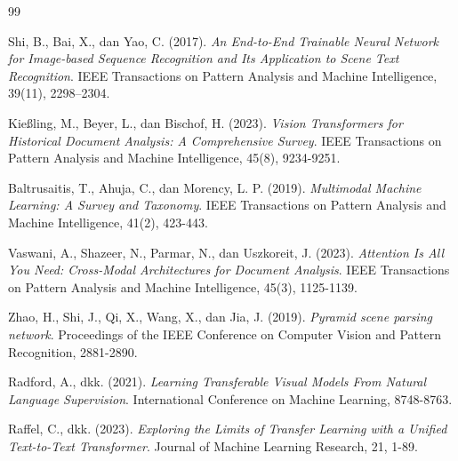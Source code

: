 \documentclass[12pt,a4paper]{book}
\begin{document}
\begin{thebibliography}{99}

Shi, B., Bai, X., dan Yao, C. (2017).
\textit{An End-to-End Trainable Neural Network for Image-based Sequence Recognition and Its Application to Scene Text Recognition}.
IEEE Transactions on Pattern Analysis and Machine Intelligence, 39(11), 2298--2304.

Kießling, M., Beyer, L., dan Bischof, H. (2023).
\textit{Vision Transformers for Historical Document Analysis: A Comprehensive Survey}.
IEEE Transactions on Pattern Analysis and Machine Intelligence, 45(8), 9234-9251.


Baltrusaitis, T., Ahuja, C., dan Morency, L. P. (2019).
\textit{Multimodal Machine Learning: A Survey and Taxonomy}.
IEEE Transactions on Pattern Analysis and Machine Intelligence, 41(2), 423-443.

Vaswani, A., Shazeer, N., Parmar, N., dan Uszkoreit, J. (2023).
\textit{Attention Is All You Need: Cross-Modal Architectures for Document Analysis}.
IEEE Transactions on Pattern Analysis and Machine Intelligence, 45(3), 1125-1139.


Zhao, H., Shi, J., Qi, X., Wang, X., dan Jia, J. (2019).
\textit{Pyramid scene parsing network}.
Proceedings of the IEEE Conference on Computer Vision and Pattern Recognition, 2881-2890.


Radford, A., dkk. (2021).
\textit{Learning Transferable Visual Models From Natural Language Supervision}.
International Conference on Machine Learning, 8748-8763.

Raffel, C., dkk. (2023).
\textit{Exploring the Limits of Transfer Learning with a Unified Text-to-Text Transformer}.
Journal of Machine Learning Research, 21, 1-89.


\end{thebibliography}
\end{document}
